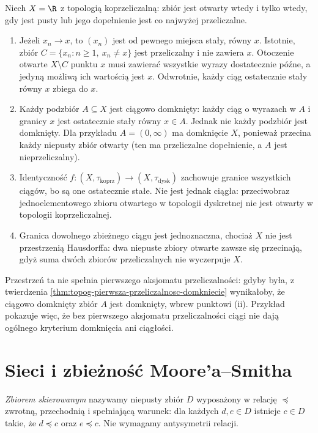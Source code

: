 \begin{przyklad}
\label{ex:topog-ciagi-koprzeliczalna}
Niech $X=\R$ z topologią koprzeliczalną:
zbiór jest otwarty wtedy i tylko wtedy, gdy jest pusty
lub jego dopełnienie jest co najwyżej przeliczalne.
\begin{enumerate}[label=(\roman*)]
\item Jeżeli $x_n\to x$, to $(x_n)$ jest od pewnego miejsca
stały, równy $x$. Istotnie, zbiór
$C=\{x_n:n\ge1,\ x_n\ne x\}$ jest przeliczalny i nie
zawiera $x$. Otoczenie otwarte $X\setminus C$ punktu $x$
musi zawierać wszystkie wyrazy dostatecznie późne,
a jedyną możliwą ich wartością jest $x$.
Odwrotnie, każdy ciąg ostatecznie stały równy $x$
zbiega do $x$.
\item Każdy podzbiór $A\subseteq X$ jest ciągowo domknięty:
każdy ciąg o wyrazach w $A$ i granicy $x$ jest ostatecznie
stały równy $x\in A$.
Jednak nie każdy podzbiór jest domknięty. Dla przykładu
$A=(0,\infty)$ ma domknięcie $X$, ponieważ przecina
każdy niepusty zbiór otwarty (ten ma przeliczalne dopełnienie,
a $A$ jest nieprzeliczalny).
\item Identyczność $f\colon(X,\tau_{\mathrm{koprz}})
\to(X,\tau_{\mathrm{dysk}})$ zachowuje granice wszystkich
ciągów, bo są one ostatecznie stałe. Nie jest jednak
ciągła: przeciwobraz jednoelementowego zbioru otwartego
w topologii dyskretnej nie jest otwarty w topologii
koprzeliczalnej.
\item Granica dowolnego zbieżnego ciągu jest jednoznaczna,
chociaż $X$ nie jest przestrzenią Hausdorffa:
dwa niepuste zbiory otwarte zawsze się przecinają,
gdyż suma dwóch zbiorów przeliczalnych nie wyczerpuje $X$.
\end{enumerate}
Przestrzeń ta nie spełnia pierwszego aksjomatu przeliczalności:
gdyby była, z twierdzenia
\ref{thm:topog-pierwsza-przeliczalnosc-domkniecie}
wynikałoby, że ciągowo domknięty zbiór $A$ jest domknięty,
wbrew punktowi (ii).
Przykład pokazuje więc, że bez pierwszego aksjomatu przeliczalności
ciągi nie dają ogólnego kryterium domknięcia ani ciągłości.
\end{przyklad}

\section{Sieci i zbieżność Moore'a--Smitha}
\label{sec:topog-sieci}

\begin{definicja}
\label{def:topog-zbior-skierowany}
\emph{Zbiorem skierowanym} nazywamy niepusty zbiór $D$
wyposażony w relację $\preceq$ zwrotną, przechodnią
i spełniającą warunek: dla każdych $d,e\in D$ istnieje
$c\in D$ takie, że $d\preceq c$ oraz $e\preceq c$.
Nie wymagamy antysymetrii relacji.
\end{definicja}


